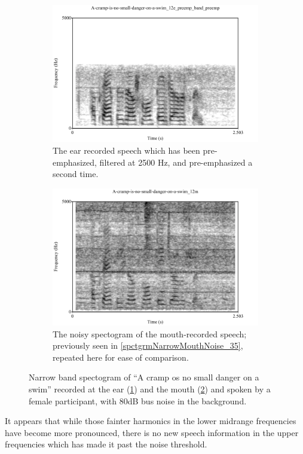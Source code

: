 \documentclass[dissertation,copyright]{uathesis}
\begin{document}
\begin{figure}[b!]
\centering
\begin{subfigure}{0.475\textwidth}
  \centering
  \includegraphics[width=1\linewidth]{figure/spctgrmNarrowEarNoisePrempFiltPremp.pdf}
  \caption{The ear recorded speech which has been pre-emphasized, filtered at 2500 Hz, and pre-emphasized a second time.}
  \label{spctgrmNarrowEarNoisePrempFiltPremp_35}
\end{subfigure}%
\hfill
\begin{subfigure}{0.475\textwidth}
  \centering
  \includegraphics[width=1\linewidth]{figure/spctgrmNarrowMthNoise_35.pdf}
  \caption{The noisy spectogram of the mouth-recorded speech; previously seen in \ref{spctgrmNarrowMouthNoise_35}, repeated here for ease of comparison.}
  \label{spctgrmNarrowMouthNoise_35_compare}
\end{subfigure}
\caption{Narrow band spectogram of ``A cramp os no small danger on a swim'' recorded at the ear (\ref{spctgrmNarrowEarNoisePrempFiltPremp_35}) and the mouth (\ref{spctgrmNarrowMouthNoise_35_compare}) and spoken by a female participant, with 80dB bus noise in the background.}
\label{fig:ear_pfp}
\end{figure}
It appears that while those fainter harmonics in the lower midrange frequencies have become more pronounced, there is no new speech information in the upper frequencies which has made it past the noise threshold.
\end{document}
